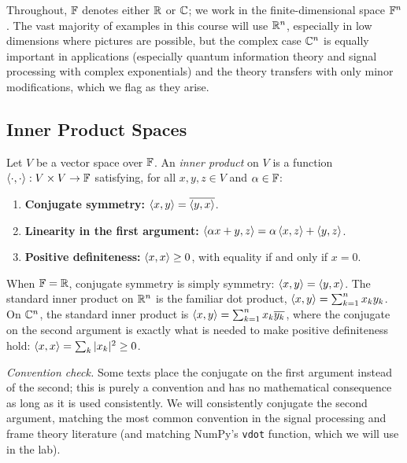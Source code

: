 Throughout, $\mathbb{F}$ denotes either $\mathbb{R}$ or $\mathbb{C}$; we work in the finite-dimensional space $\mathbb{F}^n$. The vast majority of examples in this course will use $\mathbb{R}^n$, especially in low dimensions where pictures are possible, but the complex case $\mathbb{C}^n$ is equally important in applications (especially quantum information theory and signal processing with complex exponentials) and the theory transfers with only minor modifications, which we flag as they arise.

\subsection{Inner Product Spaces}
\label{subsec:inner-product}

\begin{definition}
\label{def:inner-product}
Let $V$ be a vector space over $\mathbb{F}$. An \emph{inner product} on $V$ is a function $\left\langle \cdot, \cdot \right\rangle : V \times V \to \mathbb{F}$ satisfying, for all $x, y, z \in V$ and $\alpha \in \mathbb{F}$:
\begin{enumerate}[label=(\roman*)]
  \item \textbf{Conjugate symmetry:} $\left\langle x, y \right\rangle = \overline{\left\langle y, x \right\rangle}$.
  \item \textbf{Linearity in the first argument:} $\left\langle \alpha x + y, z \right\rangle = \alpha \left\langle x, z \right\rangle + \left\langle y, z \right\rangle$.
  \item \textbf{Positive definiteness:} $\left\langle x, x \right\rangle \geq 0$, with equality if and only if $x = 0$.
\end{enumerate}
\end{definition}

\begin{remark*}
When $\mathbb{F} = \mathbb{R}$, conjugate symmetry is simply symmetry: $\left\langle x, y \right\rangle = \left\langle y, x \right\rangle$. The standard inner product on $\mathbb{R}^n$ is the familiar dot product, $\left\langle x, y \right\rangle = \sum_{k=1}^n x_k y_k$. On $\mathbb{C}^n$, the standard inner product is $\left\langle x, y \right\rangle = \sum_{k=1}^n x_k \overline{y_k}$, where the conjugate on the second argument is exactly what is needed to make positive definiteness hold: $\left\langle x, x \right\rangle = \sum_k |x_k|^2 \geq 0$.

\emph{Convention check.} Some texts place the conjugate on the first argument instead of the second; this is purely a convention and has no mathematical consequence as long as it is used consistently. We will consistently conjugate the second argument, matching the most common convention in the signal processing and frame theory literature (and matching NumPy's \texttt{vdot} function, which we will use in the lab).
\end{remark*}

